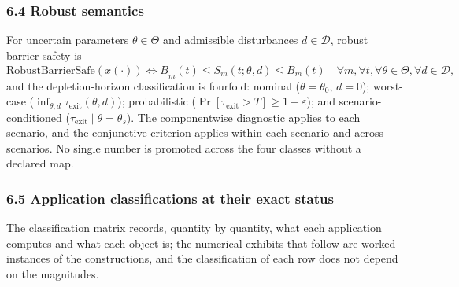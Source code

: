 \documentclass[11pt]{article}
\begin{document}
\subsubsection{6.4 Robust semantics}\label{robust-semantics}

For uncertain parameters \(\theta \in \Theta\) and admissible
disturbances \(d \in \mathcal{D}\), robust barrier safety is
\[\mathrm{RobustBarrierSafe}(x(\cdot)) \iff \underline{B}_m(t) \le S_m(t; \theta, d) \le \overline{B}_m(t) \quad \forall m, \forall t, \forall \theta \in \Theta, \forall d \in \mathcal{D},\]
and the depletion-horizon classification is fourfold: nominal
(\(\theta = \theta_0\), \(d = 0\)); worst-case
(\(\inf_{\theta,d} \tau_{\mathrm{exit}}(\theta,d)\)); probabilistic
(\(\Pr[\tau_{\mathrm{exit}} > T] \ge 1 - \varepsilon\)); and
scenario-conditioned (\(\tau_{\mathrm{exit}} \mid \theta = \theta_s\)).
The componentwise diagnostic applies to each scenario, and the
conjunctive criterion applies within each scenario and across scenarios.
No single number is promoted across the four classes without a declared
map.

\subsubsection{6.5 Application classifications at their exact
status}\label{application-classifications-at-their-exact-status}

The classification matrix records, quantity by quantity, what each
application computes and what each object is; the numerical exhibits
that follow are worked instances of the constructions, and the
classification of each row does not depend on the magnitudes.
\end{document}
